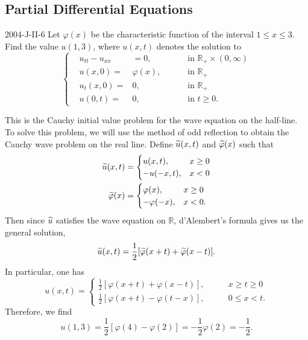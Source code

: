 \documentclass{article}
\begin{document}
	
	\subsection{Partial Differential Equations}
	\begin{prb}{2004-J-II-6}
		Let $\varphi(x)$ be the characteristic function of the interval $1 \leq x \leq 3$. Find the value $u(1,3)$, where $u(x,t)$ denotes the solution to 
		\begin{equation*}
			\left\{
			\begin{alignedat}{3}
				&u_{tt} - u_{xx} &=0, &\qquad \text{ in $\mathbb{R}_+ \times (0,\infty)$} \\
				&u(x,0) = &\varphi(x), &\qquad \text{ in $\mathbb{R}_+$} \\
				&u_t(x,0)= &0, &\qquad \text{ in $\mathbb{R}_+$} \\
				&u(0,t) = &0, &\qquad \text{ in $t \geq 0$}. 
			\end{alignedat}
			\right.
		\end{equation*}
	\end{prb}
	This is the Cauchy initial value problem for the wave equation on the half-line. To solve this problem, we will use the method of odd reflection to obtain the Cauchy wave problem on the real line. Define $\widetilde{u}(x, t)$ and $\widetilde{\varphi}(x)$ such that 
	\begin{align*}
		\begin{split}
			\widetilde{u}(x, t) &= 
			\begin{cases}
				u(x, t), & x \geq 0 \\
				-u(-x,t), & x < 0
			\end{cases} \\
			\widetilde{\varphi}(x) &= 
			\begin{cases}
				\varphi(x), & x \geq 0 \\
				-\varphi(-x), & x < 0.
			\end{cases}
		\end{split}
	\end{align*}
	Then since $\widetilde{u}$ satisfies the wave equation on $\mathbb{R}$, d'Alembert's formula gives us the general solution, 
	\begin{equation*}
		\widetilde{u}(x,t) = \frac{1}{2}[\widetilde{\varphi}(x + t) + \widetilde{\varphi}(x - t)]. 
	\end{equation*}
	In particular, one has 
	\begin{equation*}
		u(x, t) = 
		\begin{cases}
			\displaystyle \frac{1}{2}[\varphi(x + t) + \varphi(x - t)], &\qquad x \geq t \geq 0 \\
			\displaystyle \frac{1}{2}[\varphi(x + t) - \varphi(t - x)], &\qquad 0 \leq x < t. 
		\end{cases}
	\end{equation*}
	Therefore, we find 
	\begin{equation*}
		u(1,3) = \frac{1}{2}[\varphi(4) - \varphi(2)] = -\frac{1}{2}\varphi(2) = -\frac{1}{2}. 
	\end{equation*}
	
\end{document}
